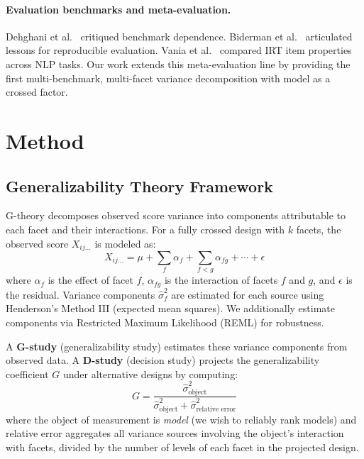 \documentclass[11pt,twocolumn]{article}
\newcommand{\Gcoeff}{\ensuremath{G}}
\begin{document}
\paragraph{Evaluation benchmarks and meta-evaluation.}
Dehghani et al.\  critiqued benchmark dependence. Biderman et al.\  articulated lessons for reproducible evaluation. Vania et al.\  compared IRT item properties across NLP tasks. Our work extends this meta-evaluation line by providing the first multi-benchmark, multi-facet variance decomposition with model as a crossed factor.

\section{Method}

\subsection{Generalizability Theory Framework}

G-theory \cite{shavelson1991generalizability,brennan2001generalizability} decomposes observed score variance into components attributable to each facet and their interactions. For a fully crossed design with $k$ facets, the observed score $X_{ij\ldots}$ is modeled as:
\begin{equation}
X_{ij\ldots} = \mu + \sum_f \alpha_f + \sum_{f<g} \alpha_{fg} + \cdots + \epsilon
\end{equation}
where $\alpha_f$ is the effect of facet $f$, $\alpha_{fg}$ is the interaction of facets $f$ and $g$, and $\epsilon$ is the residual. Variance components $\hat{\sigma}^2_f$ are estimated for each source using Henderson's Method III (expected mean squares). We additionally estimate components via Restricted Maximum Likelihood (REML) for robustness.

A \textbf{G-study} (generalizability study) estimates these variance components from observed data. A \textbf{D-study} (decision study) projects the generalizability coefficient $\Gcoeff$ under alternative designs by computing:
\begin{equation}
\Gcoeff = \frac{\hat{\sigma}^2_{\text{object}}}{\hat{\sigma}^2_{\text{object}} + \hat{\sigma}^2_{\text{relative error}}}
\end{equation}
where the object of measurement is \emph{model} (we wish to reliably rank models) and relative error aggregates all variance sources involving the object's interaction with facets, divided by the number of levels of each facet in the projected design.
\end{document}
